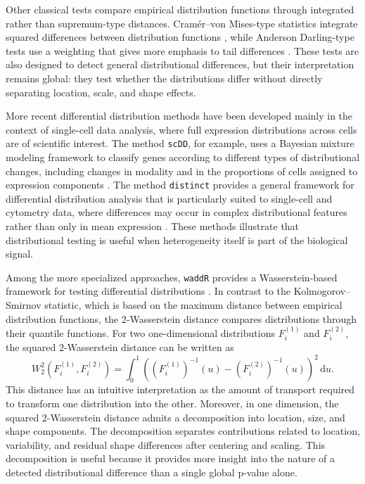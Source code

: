 Other classical tests compare empirical distribution functions through integrated rather than supremum-type distances. Cramér--von Mises-type statistics integrate squared differences between distribution functions \citep{cramer1928composition,vonmises1928wahrscheinlichkeit}, while Anderson Darling-type tests use a weighting that gives more emphasis to tail differences \citep{anderson1952asymptotic}. These tests are also designed to detect general distributional differences, but their interpretation remains global: they test whether the distributions differ without directly separating location, scale, and shape effects.

More recent differential distribution methods have been developed mainly in the context of single-cell data analysis, where full expression distributions across cells are of scientific interest. The method \texttt{scDD}, for example, uses a Bayesian mixture modeling framework to classify genes according to different types of distributional changes, including changes in modality and in the proportions of cells assigned to expression components \citep{korthauer2016statistical}. The method \texttt{distinct} provides a general framework for differential distribution analysis that is particularly suited to single-cell and cytometry data, where differences may occur in complex distributional features rather than only in mean expression \citep{tiberi2023distinct}. These methods illustrate that distributional testing is useful when heterogeneity itself is part of the biological signal.

Among the more specialized approaches, \texttt{waddR} provides a Wasserstein-based framework for testing differential distributions \citep{schefzik2021fast}. In contrast to the Kolmogorov--Smirnov statistic, which is based on the maximum distance between empirical distribution functions, the 2-Wasserstein distance compares distributions through their quantile functions. For two one-dimensional distributions $F_i^{(1)}$ and $F_i^{(2)}$, the squared 2-Wasserstein distance can be written as
\begin{equation}
\label{eq:wasserstein_distance}
W_2^2\left(F_i^{(1)},F_i^{(2)}\right) = \int_0^1 \left( \left(F_i^{(1)}\right)^{-1}(u) - \left(F_i^{(2)}\right)^{-1}(u) \right)^2 \, \mathrm{d}u.
\end{equation}
This distance has an intuitive interpretation as the amount of transport required to transform one distribution into the other. Moreover, in one dimension, the squared 2-Wasserstein distance admits a decomposition into location, size, and shape components. The decomposition separates contributions related to location, variability, and residual shape differences after centering and scaling. This decomposition is useful because it provides more insight into the nature of a detected distributional difference than a single global p-value alone.

